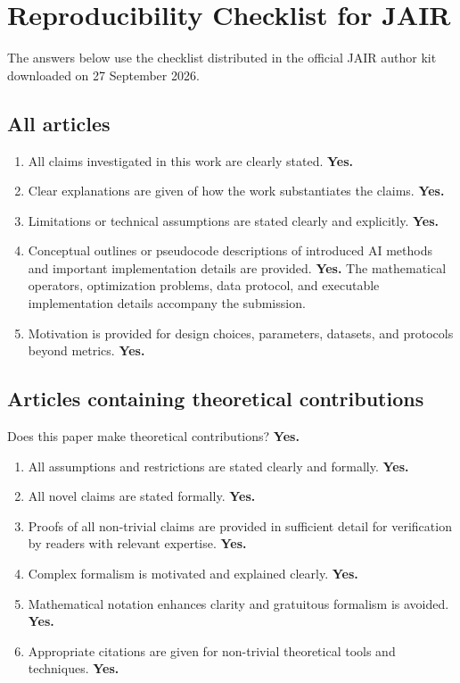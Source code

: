 \section{Reproducibility Checklist for JAIR}

The answers below use the checklist distributed in the official JAIR author
kit downloaded on 27 September 2026.

\subsection*{All articles}

\begin{enumerate}
  \item All claims investigated in this work are clearly stated. \textbf{Yes.}
  \item Clear explanations are given of how the work substantiates the claims.
    \textbf{Yes.}
  \item Limitations or technical assumptions are stated clearly and
    explicitly. \textbf{Yes.}
  \item Conceptual outlines or pseudocode descriptions of introduced AI
    methods and important implementation details are provided.
    \textbf{Yes.} The mathematical operators, optimization problems, data
    protocol, and executable implementation details accompany the submission.
  \item Motivation is provided for design choices, parameters, datasets, and
    protocols beyond metrics. \textbf{Yes.}
\end{enumerate}

\subsection*{Articles containing theoretical contributions}

Does this paper make theoretical contributions? \textbf{Yes.}

\begin{enumerate}
  \item All assumptions and restrictions are stated clearly and formally.
    \textbf{Yes.}
  \item All novel claims are stated formally. \textbf{Yes.}
  \item Proofs of all non-trivial claims are provided in sufficient detail for
    verification by readers with relevant expertise. \textbf{Yes.}
  \item Complex formalism is motivated and explained clearly. \textbf{Yes.}
  \item Mathematical notation enhances clarity and gratuitous formalism is
    avoided. \textbf{Yes.}
  \item Appropriate citations are given for non-trivial theoretical tools and
    techniques. \textbf{Yes.}
\end{enumerate}

